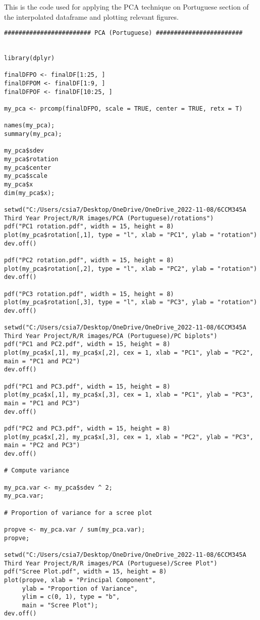 This is the code used for applying the PCA technique on Portuguese section of the interpolated dataframe and plotting relevant figures.
\begin{verbatim}
######################## PCA (Portuguese) ########################


library(dplyr)

finalDFPO <- finalDF[1:25, ]
finalDFPOM <- finalDF[1:9, ]
finalDFPOF <- finalDF[10:25, ]

my_pca <- prcomp(finalDFPO, scale = TRUE, center = TRUE, retx = T)

names(my_pca);
summary(my_pca);

my_pca$sdev
my_pca$rotation
my_pca$center
my_pca$scale
my_pca$x
dim(my_pca$x);

setwd("C:/Users/csia7/Desktop/OneDrive/OneDrive_2022-11-08/6CCM345A Third Year Project/R/R images/PCA (Portuguese)/rotations")
pdf("PC1 rotation.pdf", width = 15, height = 8) 
plot(my_pca$rotation[,1], type = "l", xlab = "PC1", ylab = "rotation")
dev.off()

pdf("PC2 rotation.pdf", width = 15, height = 8) 
plot(my_pca$rotation[,2], type = "l", xlab = "PC2", ylab = "rotation")
dev.off()

pdf("PC3 rotation.pdf", width = 15, height = 8) 
plot(my_pca$rotation[,3], type = "l", xlab = "PC3", ylab = "rotation")
dev.off()

setwd("C:/Users/csia7/Desktop/OneDrive/OneDrive_2022-11-08/6CCM345A Third Year Project/R/R images/PCA (Portuguese)/PC biplots")
pdf("PC1 and PC2.pdf", width = 15, height = 8) 
plot(my_pca$x[,1], my_pca$x[,2], cex = 1, xlab = "PC1", ylab = "PC2", main = "PC1 and PC2")
dev.off()

pdf("PC1 and PC3.pdf", width = 15, height = 8) 
plot(my_pca$x[,1], my_pca$x[,3], cex = 1, xlab = "PC1", ylab = "PC3", main = "PC1 and PC3")
dev.off()

pdf("PC2 and PC3.pdf", width = 15, height = 8) 
plot(my_pca$x[,2], my_pca$x[,3], cex = 1, xlab = "PC2", ylab = "PC3", main = "PC2 and PC3")
dev.off()

# Compute variance

my_pca.var <- my_pca$sdev ^ 2;
my_pca.var;

# Proportion of variance for a scree plot

propve <- my_pca.var / sum(my_pca.var);
propve;

setwd("C:/Users/csia7/Desktop/OneDrive/OneDrive_2022-11-08/6CCM345A Third Year Project/R/R images/PCA (Portuguese)/Scree Plot")
pdf("Scree Plot.pdf", width = 15, height = 8) 
plot(propve, xlab = "Principal Component",
     ylab = "Proportion of Variance",
     ylim = c(0, 1), type = "b",
     main = "Scree Plot");
dev.off()


\end{verbatim}
